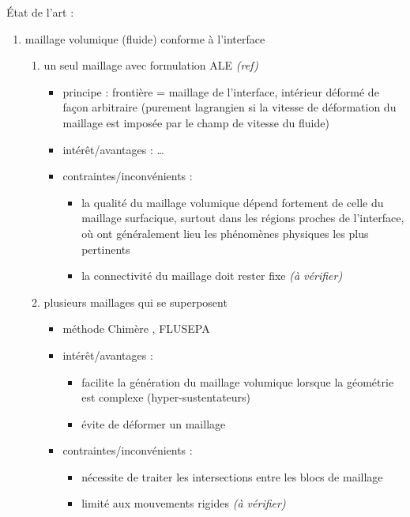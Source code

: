 État de l'art :
\begin{enumerate}
	\item maillage volumique (fluide) conforme à l'interface
	\begin{enumerate}
		\item \label{item:methodo_bodyfitted_ALE} un seul maillage  avec formulation ALE \emph{(ref)}
		\begin{itemize}
			\item principe : frontière = maillage de l'interface, intérieur déformé de façon arbitraire (purement lagrangien si la vitesse de déformation du maillage est imposée par le champ de vitesse du fluide)
			\item intérêt/avantages : \ldots
			\item contraintes/inconvénients : 
			\begin{itemize}
				\item la qualité du maillage volumique dépend fortement de celle du maillage surfacique, surtout dans les régions proches de l'interface, où ont généralement lieu les phénomènes physiques les plus pertinents
				\item la connectivité du maillage doit rester fixe \emph{(à vérifier)}
			\end{itemize}
		\end{itemize}
		
		\item plusieurs maillages  qui se superposent
		\begin{itemize}
			\item méthode Chimère \cite{meakin1989, wang2000}, FLUSEPA \cite{brenner1991}
			\item intérêt/avantages : 
			\begin{itemize}
				\item facilite la génération du maillage volumique lorsque la géométrie est complexe (\eg hyper-sustentateurs)
				\item évite de déformer un maillage \troisD
			\end{itemize}						
			\item contraintes/inconvénients : 
			\begin{itemize}
				\item nécessite de traiter les intersections entre les blocs de maillage
				\item limité aux mouvements rigides \emph{(à vérifier)}
			\end{itemize}
		\end{itemize}
	\end{enumerate}
	

\end{enumerate}
